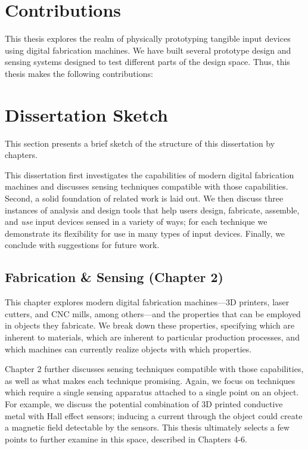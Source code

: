 \section{Contributions}

This thesis explores the realm of physically prototyping tangible input devices using digital fabrication machines. We have built several prototype design and sensing systems designed to test different parts of the design space. Thus, this thesis makes the following contributions:



\section{Dissertation Sketch}

This section presents a brief sketch of the structure of this dissertation by chapters.

This dissertation first investigates the capabilities of modern digital fabrication machines and discusses sensing techniques compatible with those capabilities. Second, a solid foundation of related work is laid out. We then discuss three instances of analysis and design tools that help users design, fabricate, assemble, and \emph{use} input devices sensed in a variety of ways; for each technique we demonstrate its flexibility for use in many types of input devices. Finally, we conclude with suggestions for future work.

\subsection{Fabrication \& Sensing (Chapter 2)}

This chapter explores modern digital fabrication machines---3D printers, laser cutters, and CNC mills, among others---and the properties that can be employed in objects they fabricate. We break down these properties, specifying which are inherent to materials, which are inherent to particular production processes, and which machines can currently realize objects with which properties.

Chapter 2 further discusses sensing techniques compatible with those capabilities, as well as what makes each technique promising. Again, we focus on techniques which require a single sensing apparatus attached to a single point on an object. For example, we discuss the potential combination of 3D printed conductive metal with Hall effect sensors; inducing a current through the object could create a magnetic field detectable by the sensors. This thesis ultimately selects a few points to further examine in this space, described in Chapters 4-6.

